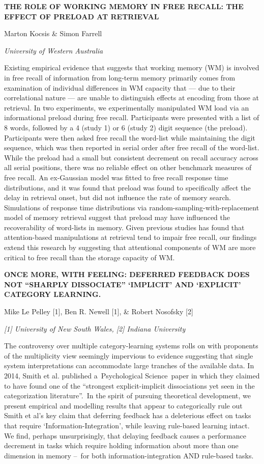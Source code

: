 \documentclass[]{article}
\begin{document}
\textbf{THE ROLE OF WORKING MEMORY IN FREE RECALL: THE EFFECT OF PRELOAD
AT RETRIEVAL}

Marton Kocsis \& Simon Farrell

\emph{University of Western Australia}

Existing empirical evidence that suggests that working memory (WM) is
involved in free recall of information from long-term memory primarily
comes from examination of individual differences in WM capacity that ---
due to their correlational nature --- are unable to distinguish effects
at encoding from those at retrieval. In two experiments, we
experimentally manipulated WM load via an informational preload during
free recall. Participants were presented with a list of 8 words,
followed by a 4 (study 1) or 6 (study 2) digit sequence (the preload).
Participants were then asked free recall the word-list while maintaining
the digit sequence, which was then reported in serial order after free
recall of the word-list. While the preload had a small but consistent
decrement on recall accuracy across all serial positions, there was no
reliable effect on other benchmark measures of free recall. An
ex-Gaussian model was fitted to free recall response time distributions,
and it was found that preload was found to specifically affect the delay
in retrieval onset, but did not influence the rate of memory search.
Simulations of response time distributions via
random-sampling-with-replacement model of memory retrieval suggest that
preload may have influenced the recoverability of word-lists in memory.
Given previous studies has found that attention-based manipulations at
retrieval tend to impair free recall, our findings extend this research
by suggesting that attentional components of WM are more critical to
free recall than the storage capacity of WM.

\textbf{ONCE MORE, WITH FEELING: DEFERRED FEEDBACK DOES NOT ``SHARPLY
DISSOCIATE'' `IMPLICIT' AND `EXPLICIT' CATEGORY LEARNING.}

Mike Le Pelley {[}1{]}, Ben R. Newell {[}1{]}, \& Robert Nosofsky
{[}2{]}

\emph{{[}1{]} University of New South Wales, {[}2{]} Indiana University}

The controversy over multiple category-learning systems rolls on with
proponents of the multiplicity view seemingly impervious to evidence
suggesting that single system interpretations can accommodate large
tranches of the available data. In 2014, Smith et al. published
a~Psychological Science~paper in which they claimed to have found one of
the ``strongest explicit-implicit dissociations yet seen in the
categorization literature''.~In the spirit of pursuing theoretical
development, we present empirical and modelling results that appear to
categorically rule out Smith et al's key claim that deferring feedback
has a deleterious effect on tasks that require
`Information-Integration', while leaving rule-based learning intact. We
find, perhaps unsurprisingly, that delaying feedback causes a
performance decrement in tasks which require holding information about
more than one dimension in memory --~for both information-integration
AND rule-based tasks.
\end{document}
